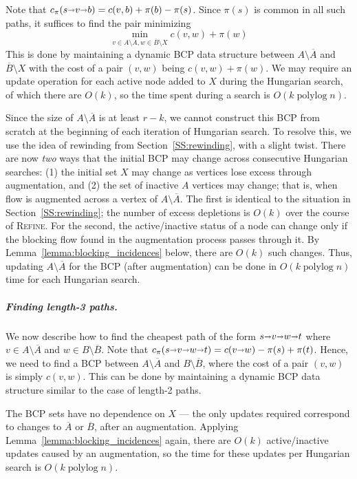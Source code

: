 \documentclass[a4paper,UKenglish]{socg-lipics-v2018}
\def\polylog{\mathop{\mathrm{polylog}}}
\def\arcto{\mathord\shortrightarrow}
\def\arc#1#2{#1\arcto#2}
\theoremstyle{plain}
\numberwithin{figure}{section}
\renewcommand{\paragraph}{\subparagraph}
\begin{document}
Note that $c_\pi(s \arcto v \arcto b) = c(v, b) + \pi(b) - \pi(s)$.
Since $\pi(s)$ is common in all such paths, it suffices to find the pair minimizing
\[
\min_{v \in A \setminus \overline{A}, w \in \overline{B} \setminus X} c(v, w) + \pi(w)
\]
This is done by maintaining a dynamic BCP data structure between
$A \setminus \overline{A}$ and $\overline{B} \setminus X$ with
the cost of a pair $(v, w)$ being $c(v, w) + \pi(w)$.
We may require an update operation for each active node added to $X$ during the
Hungarian search, of which there are $O(k)$, so the time spent during a search
is $O(k\polylog n)$.

Since the size of $A \setminus \overline{A}$ is at least $r-k$, we cannot
construct this BCP from scratch at the beginning of each iteration of Hungarian search.
To resolve this, we use the idea of rewinding from Section~\ref{SS:rewinding},
with a slight twist.
There are now \emph{two} ways that the initial BCP may change across
consecutive Hungarian searches: (1) the initial set $X$ may change as vertices
lose excess through augmentation, and (2) the set of inactive $A$ vertices may
change; that is, when flow is augmented across a vertex of $A \setminus \overline{A}$.
The first is identical to the situation in Section~\ref{SS:rewinding};
the number of excess depletions is $O(k)$ over the course of \textsc{Refine}.
For the second, the active/inactive status of a node can change only if the
blocking flow found in the augmentation process passes through it.
By Lemma~\ref{lemma:blocking_incidences} below, there are $O(k)$ such changes.
Thus, updating $A \setminus \overline{A}$ for the BCP (after augmentation)
can be done in $O(k\polylog n)$ time for each Hungarian search.

\paragraph{Finding length-3 paths.}
We now describe how to find the cheapest path of the form $s \arcto v \arcto w \arcto t$
where $v \in A \setminus \overline{A}$ and $w \in B \setminus \overline{B}$.
Note that $c_\pi(s \arcto v \arcto w \arcto t) = c(\arc vw) - \pi(s) + \pi(t)$.
Hence, we need to find a BCP between $A \setminus \overline{A}$ and $B \setminus \overline{B}$,
where the cost of a pair $(v, w)$ is simply $c(v, w)$.
This can be done by maintaining a dynamic BCP data structure similar to the
case of length-2 paths.

The BCP sets have no dependence on $X$ --- the only updates required correspond
to changes to $\overline{A}$ or $\overline{B}$, after an augmentation.
Applying Lemma~\ref{lemma:blocking_incidences} again, there are $O(k)$
active/inactive updates caused by an augmentation, so the time for these updates
per Hungarian search is $O(k\polylog n)$.
\end{document}

